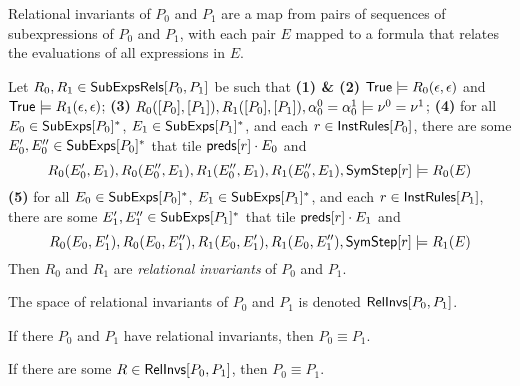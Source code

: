 Relational invariants of $P_0$ and $P_1$ are a map from pairs of
sequences of subexpressions of $P_0$ and $P_1$, with each pair $E$
mapped to a formula that relates the evaluations of all expressions in
$E$.
%
\begin{defn}
  \label{defn:rel-invs}
  Let $R_0, R_1 \in \mathsf{SubExpsRels}[ P_0, P_1 ]$ be such that %
  \textbf{(1) \& (2)} 
  $\mathsf{True} \models R_0( \epsilon, \epsilon )$ and $\mathsf{True} \models
  R_1(\epsilon, \epsilon)$;
  \textbf{(3)} $R_0([ P_0 ], [ P_1 ] ), R_1( [ P_0 ], [ P_1 ]),
  \alpha^0_0 = \alpha^1_0 \models \nu^0 = \nu^1$;
  \textbf{(4)} for all $E_0 \in \mathsf{SubExps}[ P_0 ]^{*}$, %
  $E_1 \in \mathsf{SubExps}[ P_1 ]^{*}$, and %
  each $r \in \mathsf{InstRules}[ P_0 ]$, %
  there are some $E_0', E_0'' \in \mathsf{SubExps}[ P_0 ]^{*}$ that tile
  $\mathsf{preds}[  r  ] \cdot E_0$ and
  \[ R_0(E_0', E_1), R_0(E_0'', E_1), %
  R_1(E_0'', E_1), R_1(E_0'', E_1), \symstep{ r } \entails %
  R_0(E) \]
  \textbf{(5)} for all $E_0 \in \mathsf{SubExps}[ P_0 ]^{*}$, %
  $E_1 \in \mathsf{SubExps}[ P_1 ]^{*}$, and %
  each $r \in \mathsf{InstRules}[ P_1 ]$, %
  there are some $E_1', E_1'' \in \mathsf{SubExps}[ P_1 ]^{*}$ that tile
  $\mathsf{preds}[  r  ] \cdot E_1$ and
  \[ R_0(E_0, E_1'), R_0(E_0, E_1''),
  R_1(E_0, E_1'), R_1(E_0, E_1''), \symstep{ r } \entails %
  R_1(E) \]
  Then $R_0$ and $R_1$ are \emph{relational invariants} of $P_0$ and
  $P_1$.
\end{defn}
%
%
The space of relational invariants of $P_0$ and $P_1$ is denoted
$\mathsf{RelInvs}[ P_0, P_1 ]$.

\begin{ex}
  \label{ex:rel-invs}
\end{ex}

If there $P_0$ and $P_1$ have relational invariants, then $P_0 \equiv
P_1$.
%
\begin{lemma}
  \label{lemma:equiv-evidence}
  If there are some $R \in \mathsf{RelInvs}[ P_0, P_1 ]$, then $P_0 \equiv P_1$.
\end{lemma}

